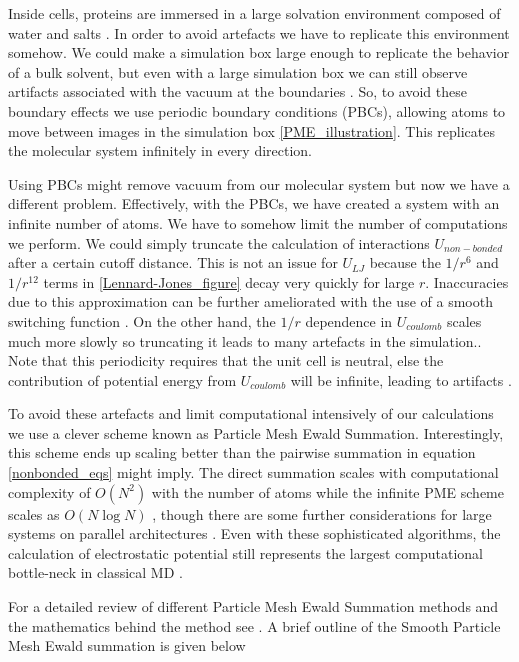 Inside cells, proteins are immersed in a large solvation environment composed of water and salts \cite{phillips2012}. In order to avoid artefacts we have to replicate this environment somehow\cite{ross2018}. We could make a simulation box large enough to replicate the behavior of a bulk solvent, but even with a large simulation box we can still observe artifacts associated with the vacuum at the boundaries \cite{gapsys2020}. So, to avoid these boundary effects we use periodic boundary conditions (PBCs), allowing atoms to move between images in the simulation box \ref{PME_illustration}. This replicates the molecular system infinitely in every direction. 

Using PBCs might remove vacuum from our molecular system but now we have a different problem. Effectively, with the PBCs, we have created a system with an infinite number of atoms. We have to somehow limit the number of computations we perform. We could simply truncate the calculation of interactions $U_{non-bonded}$ after a certain cutoff distance. This is not an issue for $U_{LJ}$ because the $1/r^6$ and $1/r^{12}$ terms in \ref{Lennard-Jones_figure} decay very quickly for large $r$. Inaccuracies due to this approximation can be further ameliorated with the use of a smooth switching function \cite{klauda2007}\cite{venable2009}. On the other hand, the $1/r$ dependence in $U_{coulomb}$ scales much more slowly so truncating it leads to many artefacts in the simulation.\cite{auffinger1995}\cite{perera1995}\cite{roberts1994}\cite{delbuono1996}\cite{essmann1995}. Note that this periodicity requires that the unit cell is neutral, else the contribution of potential energy from $U_{coulomb}$ will be infinite, leading to artifacts \cite{hub2014}.

To avoid these artefacts and limit computational intensively of our calculations we use a clever scheme known as Particle Mesh Ewald Summation. Interestingly, this scheme ends up scaling better than the pairwise summation in equation \ref{nonbonded_eqs} might imply. The direct summation scales with computational complexity of $O(N^2)$  with the number of atoms while the infinite PME scheme scales as $O (N\log N)$ \cite{darden1993}, though there are some further considerations for large systems on parallel architectures \cite{hardy2015}. Even with these sophisticated algorithms, the calculation of electrostatic potential still represents the largest computational bottle-neck in classical MD \cite{hardy2015}.

For a detailed review of different Particle Mesh Ewald Summation methods and the mathematics behind the method see \cite{shan2005}. A brief outline of the Smooth Particle Mesh Ewald summation is given below 


